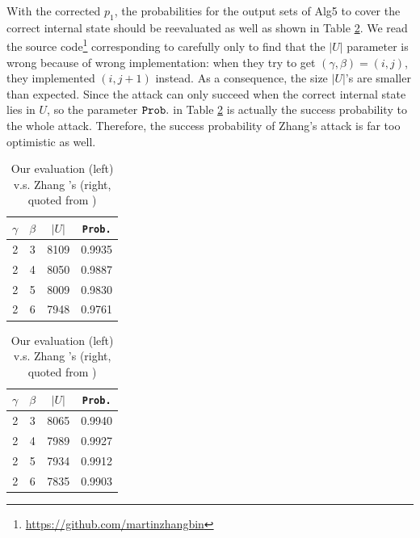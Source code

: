 With the corrected $p_1$, the probabilities for the output sets of Alg5 to cover the correct internal state should be reevaluated as well as shown in Table \ref{tab:ProbInU}.
We read the source code\footnote{\url{https://github.com/martinzhangbin}} corresponding to \cite{AC:Zhang19} carefully only to find that the $|U|$ parameter is wrong because of wrong implementation:
when they try to get $(\gamma , \beta)=(i,j)$, they implemented $(i,j+1)$ instead.
As a consequence, the size $|U|$'s are smaller than expected.
Since the attack can only succeed when the correct internal state lies in $U$, so the parameter ${\tt Prob.}$ in Table \ref{tab:ProbInU} is actually the success probability to the whole attack.
Therefore, the success probability of Zhang's attack is far too optimistic as well.
\begin{table}[htbp]
  \centering
  \caption{Our evaluation (left) v.s. Zhang \etal's (right, quoted from \cite{AC:Zhang19})}
  \begin{minipage}[t]{0.45\textwidth}
  \centering
     \begin{tabular}{c|c|c|c}
    \hline
    $\gamma$ & $\beta$ & $|U|$ & {\tt Prob.} \\
    \hline
    \hline
    2     & 3     & 8109  & 0.9935 \\
    2     & 4     & 8050  & 0.9887 \\
    2     & 5     & 8009  & 0.9830 \\
    2     & 6     & 7948  & 0.9761 \\
    \hline
    \end{tabular}%
  \end{minipage}
  \begin{minipage}[t]{0.45\textwidth}
    \centering
        \begin{tabular}{c|c|c|c}
    \hline
    $\gamma$ & $\beta$ & $|U|$ & {\tt Prob.} \\
    \hline
    \hline
    2     & 3     & 8065  & 0.9940 \\
    2     & 4     & 7989  & 0.9927 \\
    2     & 5     & 7934  & 0.9912 \\
    2     & 6     & 7835  & 0.9903 \\
    \hline
    \end{tabular}%
  \end{minipage}
  \label{tab:ProbInU}%
\end{table}%

